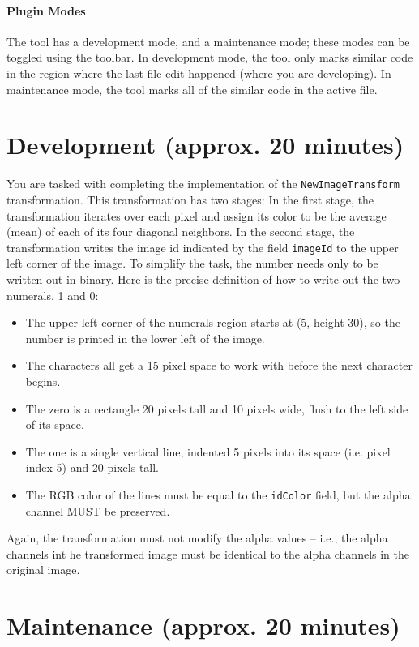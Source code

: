 \documentclass[12pt]{article}
\begin{document}
\paragraph{Plugin Modes}
The tool has a development mode, and a maintenance mode; these modes
can be toggled using the toolbar. In development mode, the tool only
marks similar code in the region where the last file edit happened
(where you are developing). In maintenance mode, the tool marks all of
the similar code in the active file.

\section{Development (approx. 20 minutes)}

You are tasked with completing the implementation of the
\verb|NewImageTransform| transformation.  This transformation has two
stages: In the first stage, the transformation iterates over each
pixel and assign its color to be the average (mean) of each of its
four diagonal neighbors. In the second stage, the transformation
writes the image id indicated by the field \verb|imageId| to the upper
left corner of the image.  To simplify the task, the number needs only
to be written out in binary.  Here is the precise definition of how to
write out the two numerals, 1 and 0:

\begin{itemize}
\item The upper left corner of the numerals region starts at (5,
  height-30), so the number is printed in the lower left of the image.
\item The characters all get a 15 pixel space to work with before the
  next character begins.
\item The zero is a rectangle 20 pixels tall and 10 pixels wide, flush
  to the left side of its space.
\item The one is a single vertical line, indented 5 pixels into its
  space (i.e. pixel index 5) and 20 pixels tall.
\item The RGB color of the lines must be equal to the \verb|idColor|
  field, but the alpha channel MUST be preserved.
\end{itemize}

Again, the transformation must not modify the alpha values -- i.e.,
the alpha channels int he transformed image must be identical to the
alpha channels in the original image.

\section{Maintenance (approx. 20 minutes)}
\end{document}
